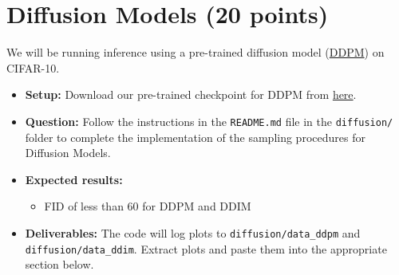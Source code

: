 \documentclass[11pt,addpoints,answers]{exam}
\numberwithin{equation}{section} %
\numberwithin{figure}{section} %
\numberwithin{table}{section} %
\begin{document}
\section{Diffusion Models (20 points)}
We will be running inference using a pre-trained diffusion model (\href{https://arxiv.org/abs/2006.11239}{DDPM}) on CIFAR-10. 
\begin{itemize}
\item \textbf{Setup:} Download our pre-trained checkpoint for DDPM from \href{https://drive.google.com/file/d/1gtn9Jv9jBUol7iJw-94hw4j6KfpG3SZE/view?usp=sharing}{here}.
\item \textbf{Question:} Follow the instructions in the \texttt{README.md} file in the \texttt{diffusion/} folder to complete the implementation of the sampling procedures for Diffusion Models.
\item \textbf{Expected results:} 
    \begin{itemize}
        \item FID of less than 60 for DDPM and DDIM
    \end{itemize}
\item \textbf{Deliverables:} The code will log plots to \texttt{diffusion/data\_ddpm} and \texttt{diffusion/data\_ddim}. Extract plots and paste them into the appropriate section below. 
\end{itemize}
\end{document}
